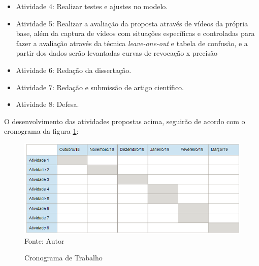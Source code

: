 \documentclass[
	12pt,				%
    oneside,			%
	a4paper,			%
	english,			%
	french,				%
	spanish,			%
	brazil,				%
	]{abntex2}
\begin{document}
\begin{itemize}
 \item Atividade 4: Realizar testes e ajustes no modelo.

 \item Atividade 5: Realizar a avaliação da proposta através de vídeos da própria base, além da captura de vídeos com situações específicas e controladas para fazer a avaliação através da técnica \textit{leave-one-out} e tabela de confusão, e a partir dos dados serão levantadas curvas de revocação x precisão

 \item Atividade 6: Redação da dissertação.
 
  \item Atividade 7: Redação e submissão de artigo científico.

 \item Atividade 8: Defesa.

\end{itemize}

O desenvolvimento das atividades propostas acima, seguirão de acordo com o cronograma da figura  
\ref{fig:cronograma}:



\begin{figure}[H]
    \centering
    \caption{Cronograma de Trabalho}
    \includegraphics[width=\textwidth]{cronograma_qualificacao1}\\
    Fonte: Autor\hfill
    \label{fig:cronograma}
\end{figure} 







\postextual
\end{document}

